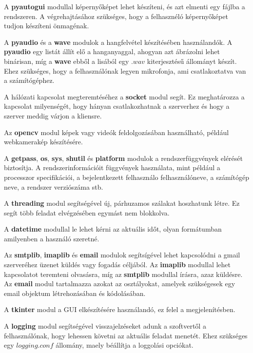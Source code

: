 \documentclass[a4paper, 11pt]{article}
\begin{document}
A \textbf{pyautogui} modullal képernyőképet lehet készíteni, és azt elmenti egy fájlba a rendszeren. A végrehajtásához szükséges, hogy a felhasznéló képernyőképet tudjon készíteni önmagénak.

A \textbf{pyaudio} és a \textbf{wave} modulok a hangfelvétel készítésében használandók. A \textbf{pyaudio} egy listát állít elő a hanganyaggal, ahogyan azt ábrázolni lehet binárisan, míg a \textbf{wave} ebből a lisából egy $.wav$ kiterjesztésű állományt készít. Ehez szükséges, hogy a felhasználónak legyen mikrofonja, ami csatlakoztatva van a számítógéphez.

A hálózati kapcsolat megteremtéséhez a \textbf{socket} modul segít. Ez meghatározza a kapcsolat milyenségét, hogy hányan csatlakozhatnak a szerverhez és hogy a szerver meddig várjon a kliensre.

Az \textbf{opencv} modul képek vagy videók feldolgozásában használható, például webkamerakép készítésére.

A \textbf{getpass}, \textbf{os}, \textbf{sys}, \textbf{shutil} és \textbf{platform} modulok a rendszerfüggvények elérését biztosítja. A rendszerinformációit függvények használata, mint például a processzor specifikációi, a bejelentkezett felhasználo felhasználóneve, a számítógép neve, a rendszer verziószáma stb.

A \textbf{threading} modul segítségével új, párhuzamos szálakat hoszhatunk létre. Ez segít több feladat elvégzésében egymást nem blokkolva.

A \textbf{datetime} modullal le lehet kérni az aktuális időt, olyan formátumban amilyenben a használó szeretné. %

Az \textbf{smtplib}, \textbf{imaplib} és \textbf{email} modulok segítsígével lehet kapcsolódni a gmail szerveréhez üzenet küldés vagy fogadás céljából. Az \textbf{imaplib} modullal lehet kapcsolatot teremteni olvasásra, míg az \textbf{smtplib} modullal írásra, azaz küldésre. Az \textbf{email} modul tartalmazza azokat az osztályokat, amelyek szükségesek egy email objektum létrehozásában és kódolásában.

A \textbf{tkinter} modul a GUI elkészítésére használandó, ez felel a megjelenítésben.

A \textbf{logging} modul segítségével visszajelzéseket adunk a szoftvertől a felhasználónak, hogy lehessen követni az aktuális feladat menetét. Ehez szükséges egy $logging.conf$ állomány, maely béállítja a loggolási opciókat.
\end{document}
